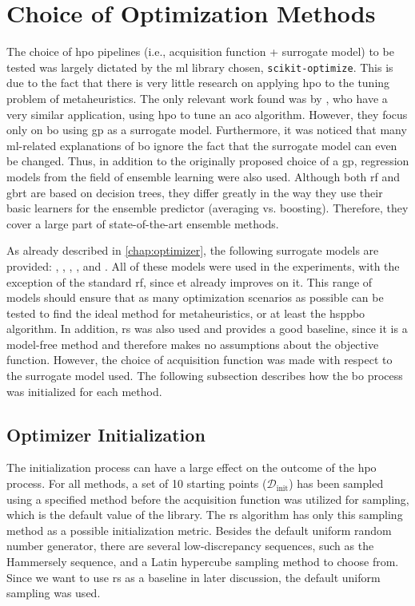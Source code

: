 \section{Choice of Optimization Methods}
\label{chap:opt-choice}

The choice of \gls{hpo} pipelines (i.e., acquisition function + surrogate model) to be tested was largely dictated by the \gls{ml} library chosen, \texttt{scikit-optimize}. This is due to the fact that there is very little research on applying \glsdesc{hpo} to the tuning problem of metaheuristics. The only relevant work found was by \citet{yin2021bayesian}, who have a very similar application, using \gls{hpo} to tune an \glsdesc{aco} algorithm. However, they focus only on \gls{bo} using \gls{gp} as a surrogate model. Furthermore, it was noticed that many \gls{ml}-related explanations of \gls{bo} ignore the fact that the surrogate model can even be changed. Thus, in addition to the originally proposed choice of a \glsdesc{gp}, regression models from the field of ensemble learning were also used. Although both \glsdesc{rf} and \glsdesc{gbrt} are based on decision trees, they differ greatly in the way they use their basic learners for the ensemble predictor (averaging vs. boosting). Therefore, they cover a large part of state-of-the-art ensemble methods.

As already described in \cref{chap:optimizer}, the following surrogate models are provided: , , , , and .
All of these models were used in the experiments, with the exception of the standard \gls{rf}, since \gls{et} already improves on it. This range of models should ensure that as many optimization scenarios as possible can be tested to find the ideal method for metaheuristics, or at least the \gls{hsppbo} algorithm. In addition, \gls{rs} was also used and provides a good baseline, since it is a model-free method and therefore makes no assumptions about the objective function. However, the choice of acquisition function was made with respect to the surrogate model used. The following subsection describes how the \gls{bo} process was initialized for each method.

\subsection{Optimizer Initialization}
\label{chap:opt-init}
The initialization process can have a large effect on the outcome of the \gls{hpo} process. For all methods, a set of 10 starting points ($\mathcal{D}_\text{init}$) has been sampled using a specified method before the acquisition function was utilized for sampling, which is the default value of the library. The \gls{rs} algorithm has only this sampling method as a possible initialization metric. Besides the default uniform random number generator, there are several low-discrepancy sequences, such as the Hammersely sequence, and a Latin hypercube sampling method to choose from. Since we want to use \gls{rs} as a baseline in later discussion, the default uniform sampling was used.

